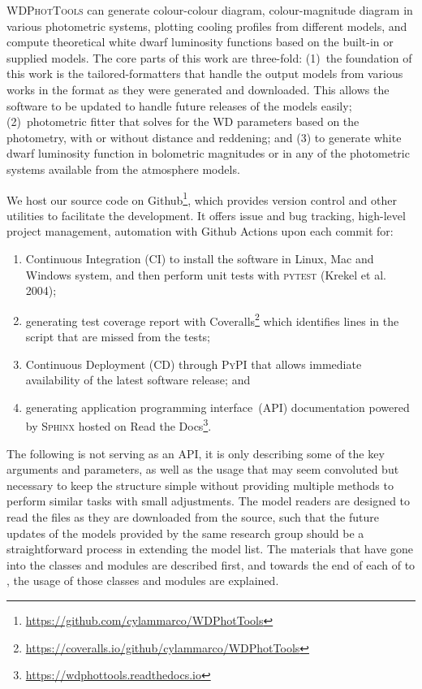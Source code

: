 \documentclass[fleqn,usenatbib]{rasti}
\begin{document}
\textsc{WDPhotTools} can generate colour-colour diagram, colour-magnitude
diagram in various photometric systems, plotting cooling profiles from
different models, and compute theoretical white dwarf luminosity functions
based on the built-in or supplied models. The core parts of this work are
three-fold: (1)~the foundation of this work is the tailored-formatters that
handle the output models from various works in the format as they were
generated and downloaded. This allows the software to be updated to handle
future releases of the models easily; (2)~photometric fitter that solves for
the WD parameters based on the photometry, with or without distance and
reddening; and (3) to generate white dwarf luminosity function in
bolometric magnitudes or in any of the photometric systems available from the
atmosphere models.

We host our source code on Github\footnote{\url{https://github.com/cylammarco/WDPhotTools}},
which provides version control and other utilities to facilitate the
development. It offers issue and bug tracking, high-level project management,
automation with Github Actions upon each commit for:

\begin{enumerate}
    \item Continuous Integration (CI) to install the software in Linux, Mac
    and Windows system, and then perform unit tests with \textsc{pytest}
    (Krekel et al. 2004);
    \item generating test coverage report with Coveralls\footnote{\url{
    https://coveralls.io/github/cylammarco/WDPhotTools}}
    which identifies
    lines in the script that are missed from the tests;
    \item Continuous Deployment (CD) through \textsc{PyPI} that allows
    immediate availability of the latest software release; and
    \item generating application programming interface~(API) documentation
    powered by \textsc{Sphinx} hosted on
    Read the Docs\footnote{\url{https://wdphottools.readthedocs.io}}.
\end{enumerate}

% 
The following is not serving as an API, it is only describing some of the key
arguments and parameters, as well as the usage that may seem convoluted but
necessary to keep the structure simple without providing multiple methods to
perform similar tasks with small adjustments. The model readers are designed
to read the files as they are downloaded from the source, such that the future
updates of the models provided by the same research group should be a
straightforward process in extending the model list. The materials that have
gone into the classes and modules are described first, and towards the end of
each of  to , the usage of those classes and modules
are explained.
\end{document}
